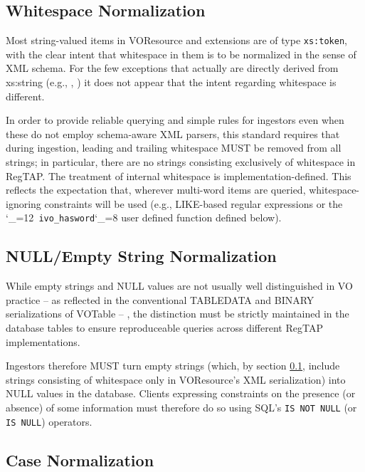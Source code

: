 \documentclass[11pt,a4paper]{ivoa}
\makeatletter
\def\rtent#1{\texttt{\color{rtcolor}\verb|#1|}}
\def\makeunderscoreletter{\catcode`\_=12}
\def\makeunderscoresubscript{\catcode`\_=8}
\def\rtent{\makeunderscoreletter\relax\rt@nt}
\def\rt@nt#1{\texttt{\color{rtcolor} #1}\makeunderscoresubscript{}}
\makeatother
\begin{document}
\subsection{Whitespace Normalization}

\label{whitenorm}

Most string-valued items in VOResource and extensions are of type
\texttt{xs:to\-ken}, with the clear intent that whitespace in them is
to be normalized in the sense of XML schema.  For the few exceptions
that actually are directly derived from xs:string (e.g.,
, ) it does not
appear that the intent regarding whitespace is different.

In order to provide reliable querying and simple rules for ingestors
even when these do not employ schema-aware XML parsers, this standard
requires that during ingestion, leading and trailing whitespace MUST be
removed from all strings; in particular, there are no strings consisting
exclusively of whitespace in RegTAP.  The treatment of internal
whitespace is implementation-defined. This reflects the expectation
that, wherever multi-word items are queried, whitespace-ignoring
constraints will be used (e.g., LIKE-based regular expressions or the
\rtent{ivo_hasword} user defined function defined below).


\subsection{NULL/Empty String Normalization}

\label{nullnorm}

While empty strings and NULL values are not usually well
distinguished in VO practice -- as reflected in the conventional
TABLEDATA and BINARY serializations of VOTable -- , the distinction
must be strictly maintained in the database tables to ensure
reproduceable queries across different RegTAP implementations.

Ingestors therefore MUST turn empty strings (which, by section \ref{whitenorm}, include strings consisting of whitespace
only in VOResource's XML serialization) into NULL values in the
database.  Clients expressing constraints on the presence (or absence)
of some information must therefore do so using SQL's \texttt{IS NOT NULL}
(or \texttt{IS NULL}) operators.


\subsection{Case Normalization}
\end{document}
